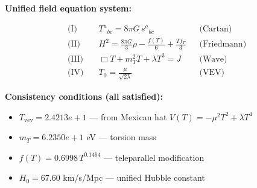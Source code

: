 
\textbf{Unified field equation system:}

\begin{align}
  \text{(I)} \quad & T^a{}_{bc} = 8\pi G \, s^a{}_{bc} && \text{(Cartan)} \\
  \text{(II)} \quad & H^2 = \frac{8\pi G}{3}\rho - \frac{f(T)}{6} + \frac{Tf_T}{3} && \text{(Friedmann)} \\
  \text{(III)} \quad & \Box T + m_T^2 T + \lambda T^3 = J && \text{(Wave)} \\
  \text{(IV)} \quad & T_0 = \frac{\mu}{\sqrt{2\lambda}} && \text{(VEV)}
\end{align}

\textbf{Consistency conditions (all satisfied):}
\begin{itemize}
  \item $T_{\text{vev}} = 2.4213e+1$ — from Mexican hat $V(T) = -\mu^2 T^2 + \lambda T^4$
  \item $m_T = 6.2350e+1$ eV — torsion mass
  \item $f(T) = 0.6998 \, T^{0.1464}$ — teleparallel modification
  \item $H_0 = 67.60$ km/s/Mpc — unified Hubble constant
\end{itemize}